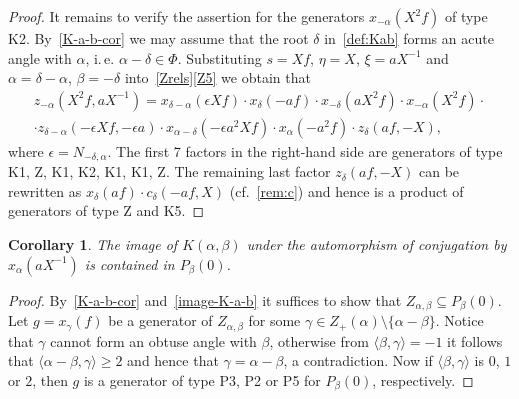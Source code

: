 \documentclass[oneside, 8pt]{amsart}
\newtheorem{corollary}[lemma]{Corollary}
\theoremstyle{remark}
\theoremstyle{definition}
\numberwithin{lemma}{section}
\numberwithin{prop}{section}
\numberwithin{corollary}{section}
\numberwithin{externaltheorem}{section}
\numberwithin{equation}{section}
\begin{document}
\begin{proof}
It remains to verify the assertion for the generators $x_{-\alpha}(X^2f) $ of type K2.
By~\cref{K-a-b-cor} we may assume that the root $\delta$ in~\cref{def:Kab} forms an acute angle with $\alpha$, i.\,e. $\alpha-\delta \in \Phi$. Substituting $s = Xf$, $\eta = X$, $\xi = aX^{-1}$ and $\alpha = \delta-\alpha$, $\beta = -\delta$ into~\cref{Zrels}\ref{Z5} we obtain that
\begin{multline*} z_{-\alpha}(X^2f, aX^{-1}) = x_{\delta-\alpha}(\epsilon Xf) \cdot x_{\delta}(-af) \cdot x_{-\delta}(aX^2 f) \cdot x_{-\alpha}(X^2f) \cdot \\
 \cdot z_{\delta-\alpha}(-\epsilon Xf, -\epsilon a) \cdot x_{\alpha-\delta}(-\epsilon a^2 Xf) \cdot x_{\alpha}(- a^2 f) \cdot z_{\delta}(a f, -X), \end{multline*}
where $\epsilon = N_{-\delta,\alpha}$. 
The first 7 factors in the right-hand side are generators of type K1, Z, K1, K2, K1, K1, Z.
The remaining last factor $z_\delta(af, -X)$ can be rewritten as $x_{\delta}(af) \cdot c_{\delta}(-af, X)$ (cf.~\cref{rem:c}) and hence is a product of generators of type Z and K5. \end{proof}

\begin{corollary} \label{K-a-b-P-b} The image of $K(\alpha, \beta)$ under the automorphism of conjugation by $x_\alpha(aX^{-1})$ is contained in $P_\beta(0)$. \end{corollary}
\begin{proof} 
By~\cref{K-a-b-cor} and~\cref{image-K-a-b} it suffices to show that $Z_{\alpha, \beta} \subseteq P_\beta(0)$. Let $g = x_{\gamma}(f)$ be a generator of $Z_{\alpha, \beta}$ for some
$\gamma \in Z_+(\alpha) \setminus \{\alpha - \beta \}$. Notice that $\gamma$ cannot form an obtuse angle with $\beta$, otherwise from $\langle \beta, \gamma \rangle = -1$ it follows that $ \langle \alpha - \beta, \gamma \rangle \geq 2$ and hence that $\gamma = \alpha - \beta$, a contradiction.
Now if $\langle \beta, \gamma \rangle$ is $0$, $1$ or $2$, then $g$ is a generator of type P3, P2 or P5 for $P_\beta(0)$, respectively.\end{proof}
\end{document}
